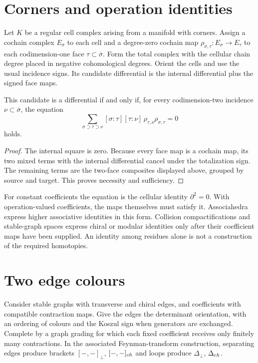 \section{Corners and operation identities}
Let $K$ be a regular cell complex arising from a manifold with corners.
Assign a cochain complex $E_\sigma$ to each cell and a degree-zero cochain map
$\rho_{\sigma,\tau}:E_\sigma\to E_\tau$ to each codimension-one face
$\tau\subset\overline\sigma$.
Form the total complex with the cellular chain degree placed in negative
cohomological degrees. Orient the cells and use the usual incidence signs.
Its candidate differential is the internal differential plus the signed face maps.

\begin{proposition}
This candidate is a differential if and only if, for every codimension-two
incidence $\nu\subset\overline\sigma$, the equation
\[
 \sum_{\sigma\supset\tau\supset\nu}
  [\sigma:\tau][\tau:\nu]\,
  \rho_{\tau,\nu}\rho_{\sigma,\tau}=0
\]
holds.
\end{proposition}
\begin{proof}
The internal square is zero. Because every face map is a cochain map,
its two mixed terms with the internal differential cancel under the totalization sign.
The remaining terms are the two-face composites displayed above, grouped by
source and target. This proves necessity and sufficiency.
\end{proof}

For constant coefficients the equation is the cellular identity $\partial^2=0$.
With operation-valued coefficients, the maps themselves must satisfy it.
Associahedra express higher associative identities in this form.
Collision compactifications and stable-graph spaces express chiral or modular
identities only after their coefficient maps have been supplied.
An identity among residues alone is not a construction of the required homotopies.

\section{Two edge colours}
Consider stable graphs with transverse and chiral edges, and coefficients with
compatible contraction maps. Give the edges the determinant orientation,
with an ordering of colours and the Koszul sign when generators are exchanged.
Complete by a graph grading for which each fixed coefficient receives only
finitely many contractions. In the associated Feynman-transform construction,
separating edges produce brackets $[-,-]_\perp$, $[-,-]_{ch}$ and loops
produce $\Delta_\perp$, $\Delta_{ch}$.

